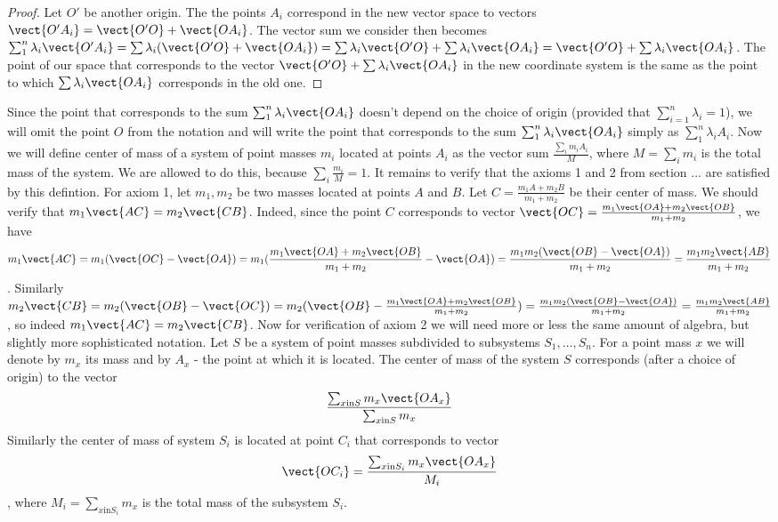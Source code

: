 \begin{proof}
Let $O'$ be another origin. The the points $A_i$ correspond in the new vector space to vectors $\vect{O'A_i}=\vect{O'O}+\vect{OA_i}$. The vector sum we consider then becomes $\sum_1^n{\lambda_i\vect{O'A_i}}=\sum{\lambda_i(\vect{O'O}+\vect{OA_i})}=\sum{\lambda_i \vect{O'O}}+\sum{\lambda_i\vect{OA_i}}=\vect{O'O}+\sum{\lambda_i\vect{OA_i}}$. The point of our space that corresponds to the vector $\vect{O'O}+\sum{\lambda_i\vect{OA_i}}$ in the new coordinate system is the same as the point to which $\sum{\lambda_i\vect{OA_i}}$ corresponds in the old one.
\end{proof}
Since the point that corresponds to the sum $\sum_1^n{\lambda_i\vect{OA_i}}$ doesn't depend on the choice of origin (provided that $\sum_{i=1}^{n}{\lambda_i}=1$), we will omit the point $O$ from the notation and will write the point that corresponds to the sum $\sum_1^n{\lambda_i\vect{OA_i}}$ simply as $\sum_1^n{\lambda_i A_i}$.
Now we will define center of mass of a system of point masses $m_i$ located at points $A_i$ as the vector sum $\frac{\sum_i{m_i A_i}}{M}$, where $M=\sum_i{m_i}$ is the total mass of the system. We are allowed to do this, because $\sum_i{\frac{m_i}{M}}=1$.
It remains to verify that the axioms 1 and 2 from section ... are satisfied by this defintion.
For axiom 1, let $m_1,m_2$ be two masses located at points $A$ and $B$. Let $C=\frac{m_1 A+m_2 B}{m_1+m_2}$ be their center of mass. We should verify that $m_1 \vect{AC}=m_2 \vect{CB}$. Indeed, since the point $C$ corresponds to vector $\vect{OC}=\frac{m_1 \vect{OA}+m_2 \vect{OB}}{m_1+m_2}$, we have $$m_1 \vect{AC}=m_1(\vect{OC}-\vect{OA})=m_1(\frac{m_1 \vect{OA}+m_2 \vect{OB}}{m_1+m_2}-\vect{OA})=\frac{m_1 m_2(\vect{OB}-\vect{OA})}{m_1+m_2}=\frac{m_1 m_2 \vect{AB}}{m_1+m_2}$$.
Similarly $m_2 \vect{CB}=m_2(\vect{OB}-\vect{OC})=m_2(\vect{OB}-\frac{m_1 \vect{OA}+m_2\vect{OB}}{m_1+m_2})=\frac{m_1m_2(\vect{OB}-\vect{OA})}{m_1+m_2}=\frac{m_1m_2\vect{AB}}{m_1+m_2}$, so indeed $m_1\vect{AC}=m_2\vect{CB}$.
Now for verification of axiom 2 we will need more or less the same amount of algebra, but slightly more sophisticated notation. Let $S$ be a system of point masses subdivided to subsystems $S_1,\ldots,S_n$. For a point mass $x$ we will denote by $m_x$ its mass and by $A_x$ - the point at which it is located.
The center of mass of the system $S$ corresponds (after a choice of origin) to the vector $$\frac{\sum_{x \textrm{in} S}{m_x \vect{OA_x}}}{\sum_{x \textrm{in} S}{m_x}}$$
Similarly the center of mass of system $S_i$ is located at point $C_i$ that corresponds to vector $$\vect{OC_i}=\frac{\sum_{x \textrm{in} S_i}{m_x \vect{OA_x}}}{M_i}$$, where $M_i=\sum_{x \textrm{in} S_i}{m_x}$ is the total mass of the subsystem $S_i$.

